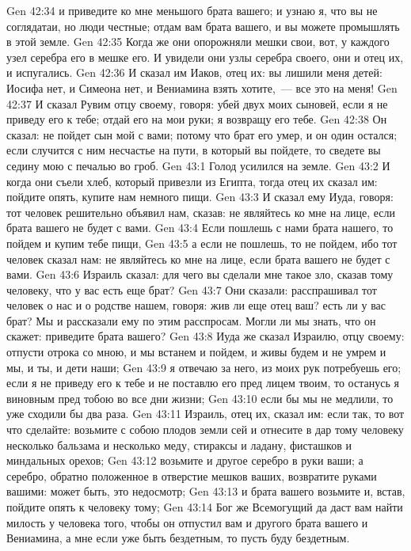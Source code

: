 \vs Gen 42:34 и приведите ко мне меньшого брата вашего; и узнаю я, что вы не соглядатаи, но люди честные; отдам вам брата вашего, и вы можете промышлять в этой земле.
\vs Gen 42:35 Когда же они опорожняли мешки свои, вот, у каждого узел серебра его в мешке его. И увидели они узлы серебра своего, они и отец их, и испугались.
\vs Gen 42:36 И сказал им Иаков, отец их: вы лишили меня детей: Иосифа нет, и Симеона нет, и Вениамина взять хотите,~--- все это на меня!
\vs Gen 42:37 И сказал Рувим отцу своему, говоря: убей двух моих сыновей, если я не приведу его к тебе; отдай его на мои руки; я возвращу его тебе.
\vs Gen 42:38 Он сказал: не пойдет сын мой с вами; потому что брат его умер, и он один остался; если случится с ним несчастье на пути, в который вы пойдете, то сведете вы седину мою с печалью во гроб.
\vs Gen 43:1 Голод усилился на земле.
\vs Gen 43:2 И когда они съели хлеб, который привезли из Египта, тогда отец их сказал им: пойдите опять, купите нам немного пищи.
\vs Gen 43:3 И сказал ему Иуда, говоря: тот человек решительно объявил нам, сказав: не являйтесь ко мне на лице, если брата вашего не будет с вами.
\vs Gen 43:4 Если пошлешь с нами брата нашего, то пойдем и купим тебе пищи,
\vs Gen 43:5 а если не пошлешь, то не пойдем, ибо тот человек сказал нам: не являйтесь ко мне на лице, если брата вашего не будет с вами.
\vs Gen 43:6 Израиль сказал: для чего вы сделали мне такое зло, сказав тому человеку, что у вас есть еще брат?
\vs Gen 43:7 Они сказали: расспрашивал тот человек о нас и о родстве нашем, говоря: жив ли еще отец ваш? есть ли у вас брат? Мы и рассказали ему по этим расспросам. Могли ли мы знать, что он скажет: приведите брата вашего?
\vs Gen 43:8 Иуда же сказал Израилю, отцу своему: отпусти отрока со мною, и мы встанем и пойдем, и живы будем и не умрем и мы, и ты, и дети наши;
\vs Gen 43:9 я отвечаю за него, из моих рук потребуешь его; если я не приведу его к тебе и не поставлю его пред лицем твоим, то останусь я виновным пред тобою во все дни жизни;
\vs Gen 43:10 если бы мы не медлили, то уже сходили бы два раза.
\vs Gen 43:11 Израиль, отец их, сказал им: если так, то вот что сделайте: возьмите с собою плодов земли сей и отнесите в дар тому человеку несколько бальзама и несколько меду, стираксы и ладану, фисташков и миндальных орехов;
\vs Gen 43:12 возьмите и другое серебро в руки ваши; а серебро, обратно положенное в отверстие мешков ваших, возвратите руками вашими: может быть, это недосмотр;
\vs Gen 43:13 и брата вашего возьмите и, встав, пойдите опять к человеку тому;
\vs Gen 43:14 Бог же Всемогущий да даст вам найти милость у человека того, чтобы он отпустил вам и другого брата вашего и Вениамина, а мне если уже быть бездетным, то пусть буду бездетным.
